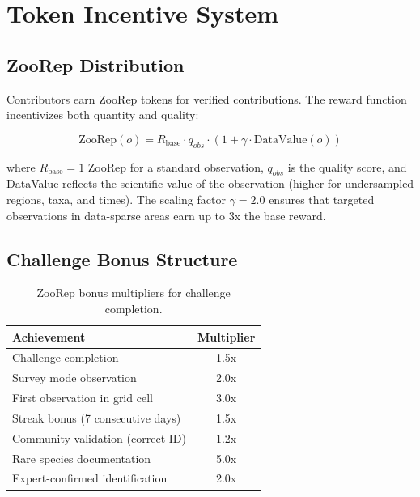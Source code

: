 \section{Token Incentive System}

\label{sec:incentives}

\subsection{ZooRep Distribution}

Contributors earn ZooRep tokens for verified contributions. The reward
function incentivizes both quantity and quality:

\begin{equation}
  \text{ZooRep}(o) = R_{\text{base}} \cdot q_{obs} \cdot
  (1 + \gamma \cdot \text{DataValue}(o))
\end{equation}

where $R_{\text{base}} = 1$ ZooRep for a standard observation, $q_{obs}$
is the quality score, and DataValue reflects the scientific value of the
observation (higher for undersampled regions, taxa, and times). The
scaling factor $\gamma = 2.0$ ensures that targeted observations in
data-sparse areas earn up to 3x the base reward.

\subsection{Challenge Bonus Structure}

\begin{table}[H]
\centering
\caption{ZooRep bonus multipliers for challenge completion.}
\label{tab:bonuses}
\begin{tabular}{lc}
\toprule
\textbf{Achievement} & \textbf{Multiplier} \\
\midrule
Challenge completion & 1.5x \\
Survey mode observation & 2.0x \\
First observation in grid cell & 3.0x \\
Streak bonus (7 consecutive days) & 1.5x \\
Community validation (correct ID) & 1.2x \\
Rare species documentation & 5.0x \\
Expert-confirmed identification & 2.0x \\
\bottomrule
\end{tabular}
\end{table}

